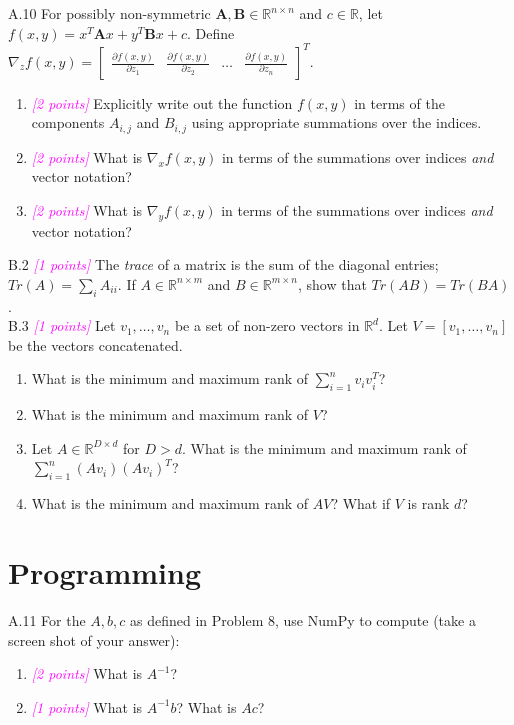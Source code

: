 \documentclass{article}
\newcommand{\field}[1]{\mathbb{#1}}
\newcommand{\1}{\mathbf{1}}
\newcommand{\R}{\field{R}} %
\newcommand{\mat}[1]{\boldsymbol{#1}} %
\newcommand{\points}[1]{\small\textcolor{magenta}{\emph{[#1 points]}} \normalsize}
\begin{document}
A.10 For possibly non-symmetric $\mat{A}, \mat{B} \in \R^{n \times n}$ and $c \in \R$, let $f(x, y) = x^T \mat{A} x + y^T \mat{B} x + c$. Define $\nabla_z f(x,y) = \begin{bmatrix} \frac{\partial f(x,y)}{\partial z_1} & \frac{\partial f(x,y)}{\partial z_2} & \dots & \frac{\partial f(x,y)}{\partial z_n} \end{bmatrix}^T$.  
\begin{enumerate}
	\item \points{2} Explicitly write out the function $f(x, y)$ in terms of the components $A_{i,j}$ and $B_{i,j}$ using appropriate summations over the indices.
	\item \points{2} What is $\nabla_x f(x,y)$ in terms of the summations over indices \emph{and} vector notation?
	\item \points{2} What is $\nabla_y f(x,y)$ in terms of the summations over indices \emph{and} vector notation?
\end{enumerate}

B.2 \points{1} The \textit{trace} of a matrix is the sum of the diagonal entries; $Tr(A) = \sum_i A_{ii}$. If $A\in\mathbb{R}^{n\times m}$ and $B\in\mathbb{R}^{m\times n}$, show that $Tr(AB) = Tr(BA)$.\\

B.3 \points{1} Let $v_1,\dots,v_n$ be a set of non-zero vectors in $\mathbb{R}^d$. Let $V = [v_1,\dots,v_n]$ be the vectors concatenated. 
    \begin{enumerate}
        \item What is the minimum and maximum rank of $\sum_{i=1}^n v_i v_i^T$?
        \item What is the minimum and maximum rank of $V$?
        \item Let $A \in \mathbb{R}^{D \times d}$ for $D > d$. What is the minimum and maximum rank of $\sum_{i=1}^n (A v_i) (A v_i)^T$?
        \item What is the minimum and maximum rank of $AV$? What if $V$ is rank $d$?
    \end{enumerate}

\section*{Programming}

A.11 For the $A, b, c$ as defined in Problem 8, use
  NumPy to compute (take a screen shot of your answer):
  \begin{enumerate}
  \item \points{2} What is $A^{-1}$?
  \item \points{1} What is $A^{-1}b$? What is $Ac$?
  \end{enumerate}  
\end{document}
